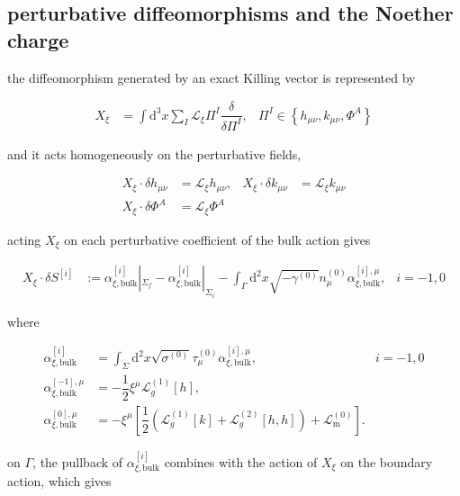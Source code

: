 \subsection{perturbative diffeomorphisms and the Noether charge}\label{subsec:perturbative-diffeomorphisms}

the diffeomorphism generated by an exact Killing vector is represented by

\begin{align}
X_{\xi} & =\int \mathrm{d}^{3}x\sum _{I}\mathcal{L}_{\xi}\Pi^{I} \dfrac{\delta}{\delta \Pi^{I}}, & \Pi^{I}\in \left\{h_{\mu \nu},k _{\mu \nu},\Phi ^{A}\right\}
\end{align}

and it acts homogeneously on the perturbative fields,

\begin{align}
X_{\xi}\cdot \delta h_{\mu \nu} & =\mathcal{L}_{\xi}h_{\mu \nu}, & X_{\xi}\cdot \delta k _{\mu \nu} & =\mathcal{L}_{\xi}k _{\mu \nu} \\
X_{\xi}\cdot \delta \Phi ^{A} & =\mathcal{L}_{\xi}\Phi ^{A}
\end{align}

acting $\displaystyle{X_{\xi}}$ on each perturbative coefficient of the bulk action gives

\begin{align}
X_{\xi}\cdot \delta S^{[i]} & := \alpha _{\xi,\mathrm{bulk}}^{[i]}|_{\Sigma _{f}}-\alpha _{\xi,\mathrm{bulk}}^{[i]}|_{\Sigma _{i}}-\int _{\Gamma}\mathrm{d}^{2}x\sqrt{ -\gamma ^{(0)} }n^{(0)}_{\mu}\alpha ^{[i],\mu}_{\xi,\mathrm{bulk}}, & i=-1,0
\end{align}

where

\begin{align}
\alpha _{\xi,\mathrm{bulk}}^{[i]} & =\int _{\Sigma} \mathrm{d}^{2}x\sqrt{ \sigma ^{(0)} }\tau _{\mu}^{(0)}\alpha _{\xi,\mathrm{bulk}}^{[i],\mu}, & i=-1,0 \\
\alpha _{\xi,\mathrm{bulk}}^{[-1],\mu} & =-\dfrac{1}{2}\xi ^{\mu}\mathcal{L}_{g}^{(1)}[h], \\
\alpha _{\xi,\mathrm{bulk}}^{[0],\mu} & =-\xi ^{\mu}\left[\dfrac{1}{2}\left(\mathcal{L}_{g}^{(1)}[k]+\mathcal{L}_{g}^{(2)}[h,h]\right)+\mathcal{L}_{\mathrm{m}}^{(0)}\right].
\end{align}

on $\displaystyle{\Gamma}$, the pullback of $\displaystyle{\alpha _{\xi,\mathrm{bulk}}^{[i]}}$ combines with the action of $\displaystyle{X_{\xi}}$ on the boundary action, which gives

